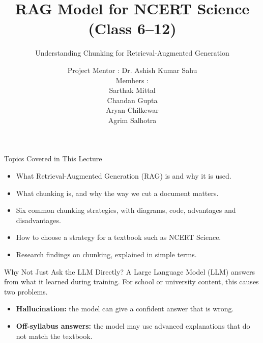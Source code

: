 \documentclass[aspectratio=169,10pt]{beamer}
\title{RAG Model for NCERT Science (Class 6--12)}
\subtitle{Understanding Chunking for Retrieval-Augmented Generation}
\author{\footnotesize Project Mentor : Dr. Ashish Kumar Sahu\\[6pt]
  Members :\\ Sarthak Mittal\\ Chandan Gupta\\ Aryan Chilkewar\\ Agrim Salhotra}
\date{}
\begin{document}
\begin{frame}
  \titlepage
\end{frame}

\begin{frame}[t]{Topics Covered in This Lecture}
\begin{itemize}
  \item What Retrieval-Augmented Generation (RAG) is and why it is used.
  \item What chunking is, and why the way we cut a document matters.
  \item Six common chunking strategies, with diagrams, code, advantages and disadvantages.
  \item How to choose a strategy for a textbook such as NCERT Science.
  \item Research findings on chunking, explained in simple terms.
\end{itemize}
\end{frame}

\begin{frame}[t]{Why Not Just Ask the LLM Directly?}
\small
A Large Language Model (LLM) answers from what it learned during training. For school or university content, this causes two problems.
\begin{itemize}
  \item \textbf{Hallucination:} the model can give a confident answer that is wrong.
  \item \textbf{Off-syllabus answers:} the model may use advanced explanations that do not match the textbook.
\end{itemize}
\vspace{14pt}
\begin{center}
\end{center}
\end{frame}
\end{document}

